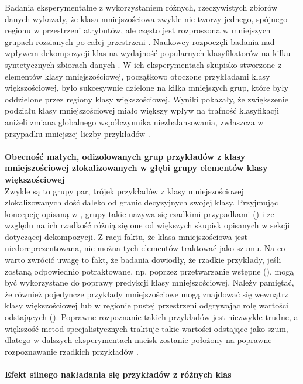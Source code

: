 \noindent Badania eksperymentalne z wykorzystaniem różnych, rzeczywistych zbiorów danych wykazały, że klasa mniejszościowa zwykle nie tworzy jednego, spójnego regionu w przestrzeni atrybutów, ale często jest rozproszona w mniejszych grupach rozsianych po całej przestrzeni \cite{Book:DataDistribution}\cite{Article:DataDistribution2}\cite{Inbook:DataDistribution}. Naukowcy rozpoczęli badania nad wpływem dekompozycji klas na wydajność popularnych klasyfikatorów na kilku syntetycznych zbiorach danych \cite{Article:DataDistribution}. W ich eksperymentach skupisko stworzone z elementów klasy mniejszościowej, początkowo otoczone przykładami klasy większościowej, było sukcesywnie dzielone na kilka mniejszych grup, które były oddzielone przez regiony klasy większościowej. Wyniki pokazały, że zwiększenie podziału klasy mniejszościowej miało większy wpływ na trafność klasyfikacji aniżeli zmiana globalnego współczynnika niezbalansowania, zwłaszcza w przypadku mniejszej liczby przykładów \cite{Article:TypyPrzykladow}.\\\\
\textbf{Obecność małych, odizolowanych grup przykładów z klasy mniejszościowej zlokalizowanych w głębi grupy elementów klasy większościowej}\\

\noindent Zwykle są to grupy par, trójek przykładów z klasy mniejszościowej zlokalizowanych dość daleko od granic decyzyjnych swojej klasy. Przyjmując koncepcję opisaną w \cite{Article:DataDistribution3}, grupy takie nazywa się rzadkimi przypadkami () i ze względu na ich rzadkość różnią się one od większych skupisk opisanych w sekcji dotyczącej dekompozycji. Z racji faktu, że klasa mniejszościowa jest niedoreprezentowana, nie można tych elementów traktować jako szumu. Na co warto zwrócić uwagę to fakt, że badania \cite{Article:DataDistribution2} dowiodły, że rzadkie przykłady, jeśli zostaną odpowiednio potraktowane, np. poprzez przetwarzanie wstępne (), mogą być wykorzystane do poprawy predykcji klasy mniejszościowej. Należy pamiętać, że również pojedyncze przykłady mniejszościowe mogą znajdować się wewnątrz klasy większościowej lub w regionie pustej przestrzeni odgrywając rolę wartości odstających (). Poprawne rozpoznanie takich przykładów jest niezwykle trudne, a większość metod specjalistycznych traktuje takie wartości odstające jako szum, dlatego w dalszych eksperymentach nacisk zostanie położony na poprawne rozpoznawanie rzadkich przykładów \cite{Article:TypyPrzykladow}.\\\\
\textbf{Efekt silnego nakładania się przykładów z różnych klas}\\


